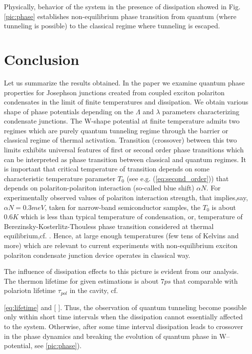 \documentclass[aps, pre, preprint, groupedaddress, superscriptaddress, showkeys, showpacs] {revtex4-1}
\begin{document}
{Physically, behavior of the system in the presence of dissipation showed in Fig. \ref{pic:phase} establishes non-equilibrium phase transition from quantum (where tunneling is possible) to the classical regime where tunneling is escaped. 

\section{Conclusion \label{sec:conclusion}}

Let us summarize the results obtained. In the paper we examine quantum phase properties for  Josephson junctions created from coupled exciton polariton condensates in the limit of finite temperatures and dissipation. We obtain  various shape of phase potentials depending on the $\Lambda$ and $\lambda$ parameters characterizing condensate junctions. The W-shape potential at finite temperature admits two regimes which are  purely quantum tunneling regime through the barrier or classical regime of thermal activation.   Transition (crossover) between this two limits exhibits universal features of first or second order phase transitions which can be interpreted as phase transition between classical and quantum regimes. It is important that critical temperature of transition depends on some  characteristic temperature  parameter $T_{0}$ (see e.g. (\ref{eq:second_order})) that depends on polariton-polariton interaction (so-called blue shift) $\alpha N$. For experimentally observed values of polariton interaction strength, that implies,say,  $\alpha N=0.3meV$, taken for narrow-band semiconductor samples, the  $T_{0}$ is about $0.6K$ which is less than  typical temperature of condensation, or, temperature of Berezinsky-Kosterlitz-Thouless phase transition considered at thermal equilibrium,cf. {\red [ ]}.  Hence, at large enough temperatures (few tens of Kelvins and more) which are relevant to current experiments with non-equilibrium  exciton polariton condensate junction device operates in classical way. 

The influence of dissipation effects to this picture is evident from our analysis. The thermon lifetime for given  estimations is about $7ps$ that comparable with polariotn lifetime $\tau_{pol}$ in the cavity, cf. {\eqref{eq:lifetime} and [ ]. Thus, the observation of quantum tunneling become possible only within short time intervals when the dissipation cannot essentially affected to the system. Otherwise, after some time interval dissipation leads to crossover in the phase dynamics  and breaking  the evolution of quantum phase in W--potential, see \ref{pic:phase}).    

}}
\end{document}
